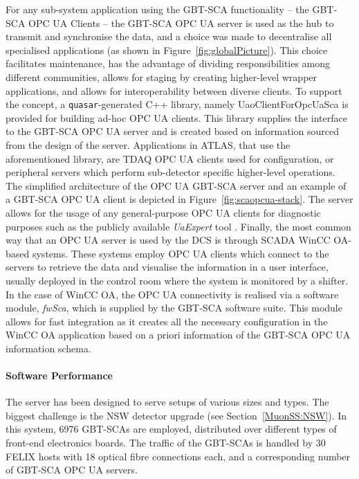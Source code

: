 \documentclass[cernpreprint, atlasdraft=false, UKenglish,british,orcidlogo, texmf, orcidlogo]{atlasdoc}
\begin{document}
For any sub-system application using the  \gls{GBT-SCA} functionality -- the  \gls{GBT-SCA} \gls{OPC UA}  Clients -- the \gls{GBT-SCA} \gls{OPC UA} server is used as the hub to transmit and synchronise the data, and a choice was made to decentralise all specialised applications (as shown in Figure~\ref{fig:globalPicture}). This choice facilitates maintenance, has the advantage of dividing responsibilities among different communities, allows for staging by creating higher-level wrapper applications, and allows for interoperability between diverse clients.
To support the concept, a \texttt{\gls{quasar}}-generated C++ library, namely UaoClientForOpcUaSca is provided for building ad-hoc \gls{OPC UA}  clients. This library supplies the interface to the \gls{GBT-SCA} \gls{OPC UA}  server and is created based on information sourced from the design of the server. Applications in ATLAS, that use the aforementioned library, are \gls{TDAQ} \gls{OPC UA}  clients used for configuration, or peripheral servers which perform sub-detector specific higher-level operations.
The simplified architecture of the \gls{OPC UA} \gls{GBT-SCA} server and an example of a \gls{GBT-SCA} \gls{OPC UA} client 
is depicted in Figure~\ref{fig:scaopcua-stack}. The server allows for the usage of any general-purpose \gls{OPC UA}  clients for diagnostic purposes such as the publicly available \textit{UaExpert} tool \cite{uaexpert}. Finally, the most common way that an \gls{OPC UA}  server is used by the \gls{DCS} is through  \gls{SCADA}  \gls{WinCC OA}-based systems. These systems employ \gls{OPC UA}  clients which connect to the servers to retrieve the data and visualise the information in a user interface, usually deployed in the control room where the system is monitored by a shifter. In the case of \gls{WinCC OA}, the \gls{OPC UA}  connectivity is realised via a software module, \textit{fwSca}, which is 
supplied by the \gls{GBT-SCA} software suite. This module allows for fast integration as it creates all the necessary configuration in the \gls{WinCC OA} application based on a priori information of the \gls{GBT-SCA} \gls{OPC UA} information schema.
 
\paragraph{  Software Performance}
 
The server has been designed to serve setups of various sizes and types. The biggest challenge is the  \gls{NSW} detector upgrade (see Section~\ref{MuonSS:NSW}). In this system, \num{6976} \glspl{GBT-SCA} are employed, distributed over different types of front-end electronics boards. The traffic of the \glspl{GBT-SCA} is handled by \num{30}  \gls{FELIX} hosts with \num{18} optical fibre connections each, and a corresponding number of \gls{GBT-SCA} \gls{OPC UA} servers.
 
\end{document}
